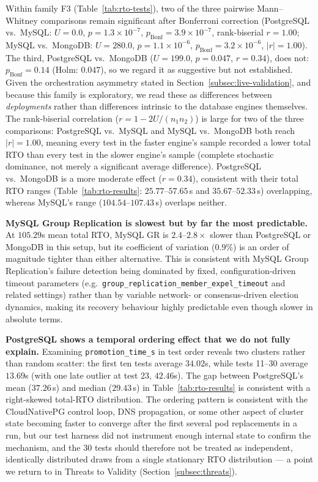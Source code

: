 \documentclass[iicol,pdflatex,sn-mathphys-num]{sn-jnl}
\theoremstyle{thmstyleone}
\theoremstyle{thmstylethree}
\begin{document}
Within family F3 (Table~\ref{tab:rto-tests}), two of the three pairwise Mann--Whitney comparisons
remain significant after Bonferroni correction (PostgreSQL vs.\ MySQL:
$U=0.0$, $p=1.3\times10^{-7}$, $p_{\text{Bonf}}=3.9\times10^{-7}$,
rank-biserial $r=1.00$; MySQL vs.\ MongoDB: $U=280.0$,
$p=1.1\times10^{-6}$, $p_{\text{Bonf}}=3.2\times10^{-6}$, $|r|=1.00$).
The third, PostgreSQL vs.\ MongoDB ($U=199.0$, $p=0.047$, $r=0.34$),
does not: $p_{\text{Bonf}}=0.14$ (Holm: $0.047$), so we regard it as
suggestive but not established. Given the orchestration asymmetry
stated in Section~\ref{subsec:live-validation}, and because this family
is exploratory, we read these as differences between \emph{deployments} rather than
differences intrinsic to the database engines themselves. The
rank-biserial correlation ($r=1-2U/(n_1 n_2)$) is large for two of
the three comparisons: PostgreSQL vs.\ MySQL and MySQL vs.\ MongoDB
both reach $|r|=1.00$, meaning every test in the faster engine's
sample recorded a lower total RTO than every test in the slower
engine's sample (complete stochastic dominance, not merely a
significant average difference). PostgreSQL vs.\ MongoDB is a more
moderate effect ($r=0.34$), consistent with their total RTO ranges
(Table~\ref{tab:rto-results}: $25.77$--$57.65$\,s and
$35.67$--$52.33$\,s) overlapping, whereas MySQL's range
($104.54$--$107.43$\,s) overlaps neither.

\textbf{MySQL Group Replication is slowest but by far the most
predictable.} At $105.29$s mean total RTO, MySQL GR is
$2.4$--$2.8\times$ slower than PostgreSQL or MongoDB in this setup,
but its coefficient of variation ($0.9\%$) is an order of magnitude
tighter than either alternative. This is consistent with MySQL Group
Replication's failure detection being dominated by fixed,
configuration-driven timeout parameters (e.g.\
\texttt{group\_replication\_member\_expel\_timeout} and related
settings) rather than by variable network- or consensus-driven
election dynamics, making its recovery behaviour highly predictable
even though slower in absolute terms.

\textbf{PostgreSQL shows a temporal ordering effect that we do not
fully explain.} Examining \texttt{promotion\_time\_s} in test order
reveals two clusters rather than random scatter: the first ten tests
average $34.02$s, while tests 11--30 average $13.69$s (with one late
outlier at test 23, $42.46$s). The gap between PostgreSQL's mean
($37.26$\,s) and median ($29.43$\,s) in Table~\ref{tab:rto-results}
is consistent with a right-skewed total-RTO distribution. The ordering pattern is consistent with the
CloudNativePG control loop, DNS propagation, or some other aspect of
cluster state becoming faster to converge after the first several
pod replacements in a run, but our test harness did not instrument
enough internal state to confirm the mechanism, and the 30 tests
should therefore not be treated as independent, identically
distributed draws from a single stationary RTO distribution --- a
point we return to in Threats to Validity
(Section~\ref{subsec:threats}).
\end{document}
